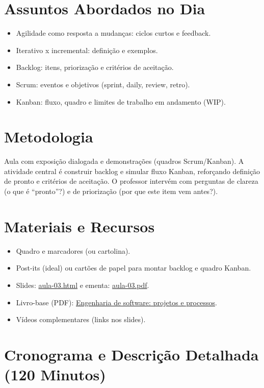 \documentclass[12pt,a4paper]{article}
\begin{document}
\section{Assuntos Abordados no Dia}
\begin{itemize}[leftmargin=*,itemsep=0.25em]
  \item Agilidade como resposta a mudanças: ciclos curtos e feedback.
  \item Iterativo x incremental: definição e exemplos.
  \item Backlog: itens, priorização e critérios de aceitação.
  \item Scrum: eventos e objetivos (sprint, daily, review, retro).
  \item Kanban: fluxo, quadro e limites de trabalho em andamento (WIP).
\end{itemize}

\section{Metodologia}
Aula com exposição dialogada e demonstrações (quadros Scrum/Kanban). A atividade central é construir backlog e simular fluxo Kanban, reforçando definição de pronto e critérios de aceitação. O professor intervém com perguntas de clareza (o que é ``pronto''?) e de priorização (por que este item vem antes?).

\section{Materiais e Recursos}
\begin{itemize}[leftmargin=*,itemsep=0.25em]
  \item Quadro e marcadores (ou cartolina).
  \item Post-its (ideal) ou cartões de papel para montar backlog e quadro Kanban.
  \item Slides: \href{aula-03.html}{aula-03.html} e ementa: \href{aula-03.pdf}{aula-03.pdf}.
  \item Livro-base (PDF): \href{../99-Materiais/Engenharia%20de%20software%20projetos%20e%20processos%20by%20Wilson%20de%20P%C3%A1dua%20Paula%20Filho%20.epub.pdf}{Engenharia de software: projetos e processos}.
  \item Vídeos complementares (links nos slides).
\end{itemize}

\section{Cronograma e Descrição Detalhada (120 Minutos)}
\end{document}
